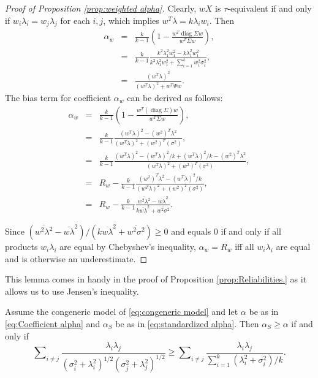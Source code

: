 \documentclass[twoside]{article}
\DeclareMathOperator{\diag}{diag}
\DeclareMathOperator{\tsum}{\textstyle \sum}
\renewcommand{\sqrt}[1]{{(#1)^{1/2}}}
\begin{document}
\begin{proof}[Proof of Proposition \ref{prop:weighted alpha}]
\label{proof:weighted alpha}Clearly, $wX$ is $\tau$-equivalent
if and only if $w_{i}\lambda_{i}=w_{j}\lambda_{j}$ for each $i,j$,
which implies $w^{T}\lambda=k\lambda_{i}w_{i}$. Then
\begin{eqnarray*}
\alpha_{w} & = & \frac{k}{k-1}\left(1-\frac{w^{T}\diag\Sigma w}{w^{T}\Sigma w}\right),\\
 & = & \frac{k}{k-1}\frac{k^{2}\lambda_{1}^{2}w_{1}^{2}-k\lambda_{1}^{2}w_{1}^{2}}{k^{2}\lambda_{1}^{2}w_{1}^{2}+\tsum_{i=1}^{k}w_{i}^{2}\sigma_{i}^{2}},\\
 & = & \frac{(w^{T}\lambda)^{2}}{(w^{T}\lambda)^{2}+w^{T}\Psi w}.
\end{eqnarray*}
The bias term for coefficient $\alpha_w$ can be derived as follows:
\begin{eqnarray*}
\alpha_{w} & = & \frac{k}{k-1}\left(1-\frac{w^{T}(\diag\Sigma)w}{w^{T}\Sigma w}\right),\\
 & = & \frac{k}{k-1}\frac{(w^{T}\lambda)^{2}-(w^{2})^{T}\lambda^{2}}{(w^{T}\lambda)^{2}+(w^{2})^{T}(\sigma^{2})},\\
 & = & \frac{k}{k-1}\frac{(w^{T}\lambda)^{2}-(w^{T}\lambda)^{2}/k+(w^{T}\lambda)^{2}/k-(w^{2})^{T}\lambda^{2}}{(w^{T}\lambda)^{2}+(w^{2})^{T}(\sigma^{2})},\\
 & = &  R_{w}-\frac{k}{k-1}\frac{(w^{2})^{T}\lambda^{2}-(w^{T}\lambda)^{2}/k}{(w^{T}\lambda)^{2}+(w^{2})^{T}(\sigma^{2})},\\
 & = &  R_{w}-\frac{k}{k-1}\frac{\overline{w^{2}\lambda^{2}}-\overline{w\lambda}^{2}}{k\overline{w\lambda}^{2}+\overline{w^{2}\sigma^{2}}}.
\end{eqnarray*}

Since $(\overline{w^{2}\lambda^{2}}-\overline{w\lambda}^{2})/(k\overline{w\lambda}^{2}+\overline{w^{2}\sigma^{2}})\geq0$
and equals $0$ if and only if all products $w_i\lambda_i$ are equal by Chebyshev's inequality, $\alpha_w= R_w$
iff all $w_i\lambda_i$ are equal and is otherwise an underestimate. 
\end{proof}

This lemma comes in handy in the proof of Proposition \ref{prop:Reliabilities.} as it allows us to use Jensen's inequality.

\begin{lem}
\label{lem:alpha_s}
Assume the congeneric model of \eqref{eq:congeneric model} and let $\alpha$ be as in \eqref{eq:Coefficient alpha} and $\alpha_S$ be as in \eqref{eq:standardized alpha}. Then $\alpha_S\geq\alpha$
if and only if
\begin{equation}
\label{eq:Alpha-alpha_s inequality}
\tsum_{i\neq j}\frac{\lambda_{i}\lambda_{j}}{\sqrt{\sigma_{i}^{2}+\lambda_{i}^{2}}\sqrt{\sigma_j^{2}+\lambda_{j}^{2}}} 
\geq
\tsum_{i\neq j}\frac{\lambda_{i}\lambda_{j}}{\tsum_{i=1}^{k}(\lambda_{i}^{2}+\sigma_{i}^{2})/k}.
\end{equation}
\end{lem}
\end{document}
